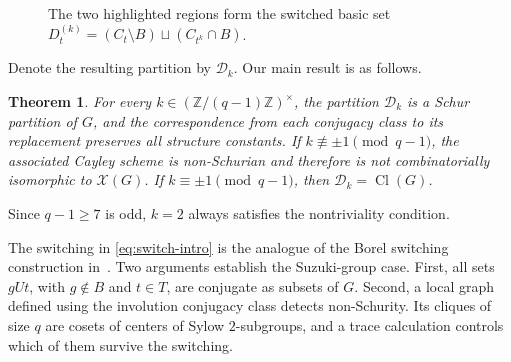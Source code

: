 \documentclass[11pt]{amsart}
\numberwithin{equation}{section}
\newtheorem{theorem}{Theorem}[section]
\theoremstyle{definition}
\theoremstyle{remark}
\newcommand{\Cl}{\operatorname{Cl}}
\newcommand{\X}{\mathcal X}
\newcommand{\D}{\mathcal D}
\begin{document}
\begin{figure}[htbp]
\centering
{}
\caption{The two highlighted regions form the switched basic set $D_t^{(k)}=(C_t\setminus B)\sqcup(C_{t^k}\cap B)$.}
\label{fig:switched-class-Ct}
\end{figure}

Denote the resulting partition by $\D_k$. 
Our main result is as follows.
\begin{theorem}\label{thm:main}
For every $k\in(\mathbb Z/(q-1)\mathbb Z)^\times$, the partition $\D_k$ is a Schur partition of $G$, and the correspondence from each conjugacy class to its replacement preserves all structure constants.
If $k\not\equiv\pm1\pmod{q-1}$, the associated Cayley scheme is non-Schurian and therefore is not combinatorially isomorphic to $\X(G)$.
If $k\equiv\pm1\pmod{q-1}$, then $\D_k=\Cl(G)$.
\end{theorem}

Since $q-1\geq7$ is odd, $k=2$ always satisfies the nontriviality condition. 

The switching in \eqref{eq:switch-intro} is the analogue of the Borel switching construction in~\cite[Section~4]{HKK}. 
Two arguments establish the Suzuki-group case. 
First, all sets $gUt$, with $g\notin B$ and $t\in T$, are conjugate as subsets of $G$. 
Second, a local graph defined using the involution conjugacy class detects non-Schurity. 
Its cliques of size $q$ are cosets of centers of Sylow $2$-subgroups, and a trace calculation controls which of them survive the switching. 
\end{document}

